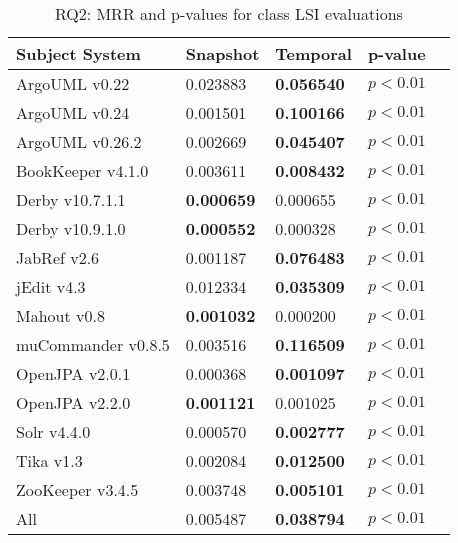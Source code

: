 
\begin{table}[t]
\renewcommand{\arraystretch}{1.3}
\footnotesize
\centering
\caption{RQ2: MRR and p-values for class LSI evaluations}
\begin{tabular}{l|ll|ll}
   \toprule
    Subject System & Snapshot & Temporal & p-value  \\
    \midrule

ArgoUML v0.22 & 0.023883 & {\bf 0.056540 } & $p < 0.01$ \\
ArgoUML v0.24 & 0.001501 & {\bf 0.100166 } & $p < 0.01$ \\
ArgoUML v0.26.2 & 0.002669 & {\bf 0.045407 } & $p < 0.01$ \\
BookKeeper v4.1.0 & 0.003611 & {\bf 0.008432 } & $p < 0.01$ \\
Derby v10.7.1.1 & {\bf 0.000659 } & 0.000655 & $p < 0.01$ \\
Derby v10.9.1.0 & {\bf 0.000552 } & 0.000328 & $p < 0.01$ \\
JabRef v2.6 & 0.001187 & {\bf 0.076483 } & $p < 0.01$ \\
jEdit v4.3 & 0.012334 & {\bf 0.035309 } & $p < 0.01$ \\
Mahout v0.8 & {\bf 0.001032 } & 0.000200 & $p < 0.01$ \\
muCommander v0.8.5 & 0.003516 & {\bf 0.116509 } & $p < 0.01$ \\
OpenJPA v2.0.1 & 0.000368 & {\bf 0.001097 } & $p < 0.01$ \\
OpenJPA v2.2.0 & {\bf 0.001121 } & 0.001025 & $p < 0.01$ \\
Solr v4.4.0 & 0.000570 & {\bf 0.002777 } & $p < 0.01$ \\
Tika v1.3 & 0.002084 & {\bf 0.012500 } & $p < 0.01$ \\
ZooKeeper v3.4.5 & 0.003748 & {\bf 0.005101 } & $p < 0.01$ \\
\midrule
All & 0.005487 & {\bf 0.038794 } & $p < 0.01$ \\

    \bottomrule
\end{tabular}
\label{table:rq2:class:lsi}
\end{table}

